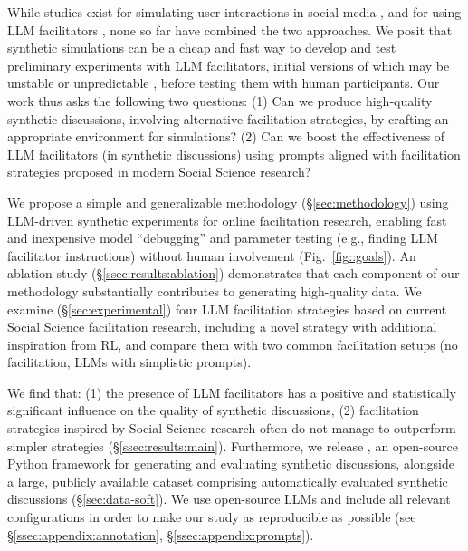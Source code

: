 While studies exist for simulating user interactions in social media \cite{park_simulacra, mou_2024, tornberg_2023, y_social, balog_2024}, and for using \ac{LLM} facilitators \cite{kim_et_al_chatbot, cho-etal-2024-language}, none so far have combined the two approaches. We posit that synthetic simulations can be a cheap and fast way to develop and test preliminary experiments with \ac{LLM} facilitators, initial versions of which may be unstable or unpredictable \cite{atil_2025, rossi_2024}, before testing them with human participants. Our work thus asks the following two questions: (1) Can we produce high-quality synthetic discussions, involving alternative facilitation strategies, by crafting an appropriate environment for simulations? (2) Can we boost the effectiveness of \ac{LLM} facilitators (in synthetic discussions) using prompts aligned with facilitation strategies proposed in modern Social Science research?

We propose a simple and generalizable methodology (\S\ref{sec:methodology}) using \ac{LLM}-driven synthetic experiments for online facilitation research, enabling fast and inexpensive model “debugging” and parameter testing (e.g., finding \ac{LLM} facilitator instructions) without human involvement (Fig.~\ref{fig::goals}). An ablation study (\S\ref{ssec:results:ablation}) demonstrates that each component of our methodology substantially contributes to generating high-quality data. We examine (\S\ref{sec:experimental}) four \ac{LLM} facilitation strategies based on current Social Science facilitation research, including a novel strategy with additional inspiration from \ac{RL}, and compare them with two common facilitation setups (no facilitation, \acp{LLM} with simplistic prompts).

We find that: (1) the presence of \ac{LLM} facilitators has a positive and statistically significant influence on the quality of synthetic discussions, (2) facilitation strategies inspired by Social Science research often do not manage to outperform simpler strategies (\S\ref{ssec:results:main}).
Furthermore, we release \syndisco, an open-source Python framework for generating and evaluating synthetic discussions, alongside \vmd\datasetlink a large, publicly available dataset comprising automatically evaluated synthetic discussions (\S\ref{sec:data-soft}). 
We use open-source \acp{LLM} and include all relevant configurations in order to make our study as reproducible as possible (see \S\ref{ssec:appendix:annotation}, \S\ref{ssec:appendix:prompts}).
